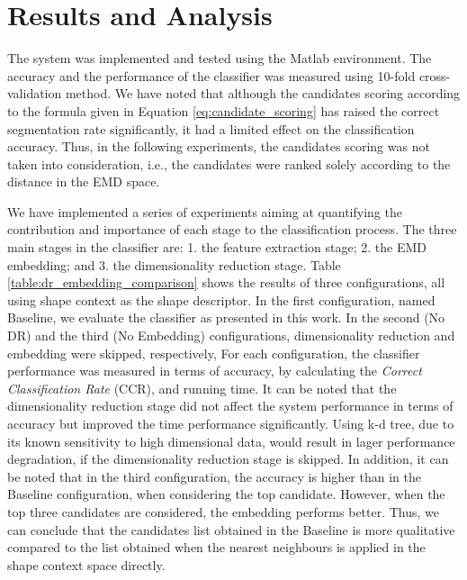 \documentclass[10pt, conference, compsocconf]{IEEEtran}
\begin{document}
\section{Results and Analysis}
\label{sec:results_analysis}

The system was implemented and tested using the Matlab environment.
The accuracy and the performance of the classifier was measured using 10-fold cross-validation method.
We have noted that although the candidates scoring according to the formula given in Equation \ref{eq:candidate_scoring} has raised the correct segmentation rate significantly, it had a limited effect on the classification accuracy. 
Thus, in the following experiments, the candidates scoring was not taken into consideration, i.e., the candidates were ranked solely according to the distance in the EMD space.

We have implemented a series of experiments aiming at quantifying the contribution and importance of each stage to the classification process.
The three main stages in the classifier are: 1. the feature extraction stage; 2. the EMD embedding; and 3. the dimensionality reduction stage.
Table \ref{table:dr_embedding_comparison} shows the results of three configurations, all using shape context as the shape descriptor.
In the first configuration, named Baseline, we evaluate the classifier as presented in this work.
In the second (No DR) and the third (No Embedding) configurations, dimensionality reduction and embedding were skipped, respectively,
For each configuration, the classifier performance was measured in terms of accuracy, by calculating the \emph{Correct Classification Rate} (CCR), and running time.
It can be noted that the dimensionality reduction stage did not affect the system performance in terms of accuracy but improved the time performance significantly.
Using k-d tree, due to its known sensitivity to high dimensional data, would result in lager performance degradation, if the dimensionality reduction stage is skipped.
In addition, it can be noted that in the third configuration, the accuracy is higher than in the Baseline configuration, when considering the top candidate. 
However, when the top three candidates are considered, the embedding performs better.
Thus, we can conclude that the candidates list obtained in the Baseline is more qualitative compared to the list obtained when the nearest neighbours is applied in the shape context space directly.
\end{document}
